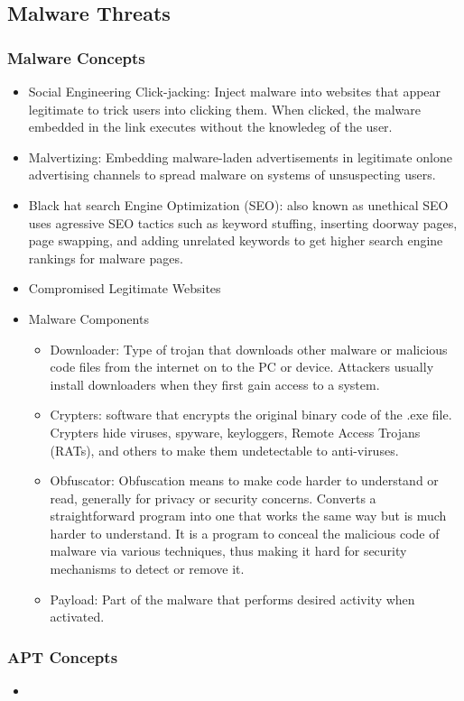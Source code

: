 \subsection{Malware Threats}
\subsubsection{Malware Concepts}
\begin{itemize}
    \item Social Engineering Click-jacking: Inject malware into websites that appear legitimate to trick users into clicking them. When clicked, the malware embedded in the link executes without the knowledeg of the user.
    \item Malvertizing: Embedding malware-laden advertisements in legitimate onlone advertising channels to spread malware on systems of unsuspecting users.
    \item Black hat search Engine Optimization (SEO): also known as unethical SEO uses agressive SEO tactics such as keyword stuffing, inserting doorway pages, page swapping, and adding unrelated keywords to get higher search engine rankings for malware pages.
    \item Compromised Legitimate Websites
    \item Malware Components
    \begin{itemize}
        \item Downloader: Type of trojan that downloads other malware or malicious code files from the internet on to the PC or device. Attackers usually install downloaders when they first gain access to a system.
        \item Crypters: software that encrypts the original binary code of the .exe file. Crypters hide viruses, spyware, keyloggers, Remote Access Trojans (RATs), and others to make them undetectable to anti-viruses.
        \item Obfuscator: Obfuscation means to make code harder to understand or read, generally for privacy or security concerns. Converts a straightforward program into one that works the same way but is much harder to understand. It is a program to conceal the malicious code of malware via various techniques, thus making it hard for security mechanisms to detect or remove it.
        \item Payload: Part of the malware that performs desired activity when activated. 
    \end{itemize}
\end{itemize}
\subsubsection{APT Concepts}
\begin{itemize}
    \item 
\end{itemize}
